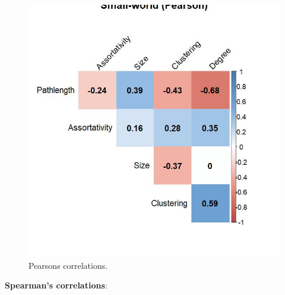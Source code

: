 \documentclass[
]{article}
\begin{document}
\begin{figure}[!H]

{\centering \includegraphics{./Figures/unnamed-chunk-78-3} 

}

\caption{Pearsons correlations.}\label{fig:unnamed-chunk-78-3}
\end{figure}

\textbf{Spearman's correlations}:
\end{document}
